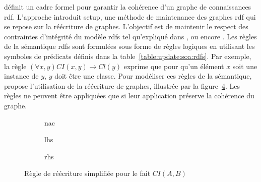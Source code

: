\cite{chabinUsingGraphGrammar2019} définit un cadre formel pour garantir la cohérence d'un graphe de connaissances \gls{rdf}.
L'approche introduit \gls{setup}, une méthode de maintenance des graphes \gls{rdf} qui se repose sur la réécriture de graphes.
L'objectif est de maintenir le respect des contraintes d'intégrité du modèle \gls{rdfs} tel qu'expliqué dans \cite{flourisFormalFoundationsRDF2013}, \cite{halfedferrariRDFUpdatesConstraints2017} ou encore \cite{chabinConsistentUpdatingDatabases2020}.
Les règles de la sémantique \gls{rdfs} sont formulées sous forme de règles logiques en utilisant les symboles de prédicats définis dans la table~\ref{table:update:soa:rdfs}.
Par exemple, la règle $(\forall x,y) CI(x,y) \to Cl(y)$ exprime que pour qu'un élément $x$ soit une instance de $y$, $y$ doit être une classe.
Pour modéliser ces règles de la sémantique, \cite{chabinUsingGraphGrammar2019} propose l'utilisation de la réécriture de graphes, illustrée par la figure~\ref{fig:gram_rule}.
Les règles ne peuvent être appliquées que si leur application préserve la cohérence du graphe.

\begin{figure}[ht]
    \centering
    \begin{subfigure}[b]{.3\textwidth}
        \centering
        \caption{\acs{nac}}
        \label{fig:gram_rule:nac}
    \end{subfigure}
    \begin{subfigure}[b]{.3\textwidth}
        \centering
        \caption{\acs{lhs}}
        \label{fig:gram_rule:lhs}
    \end{subfigure}
    \begin{subfigure}[b]{.3\textwidth}
        \centering
        \caption{\acs{rhs}}
        \label{fig:gram_rule:rhs}
    \end{subfigure}
    \caption{Règle de réécriture simplifiée pour le fait $CI(A,B)$}
    \label{fig:gram_rule}
\end{figure}

